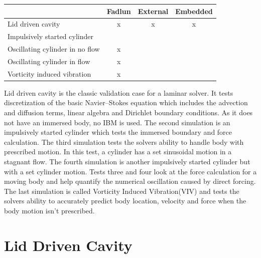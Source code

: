 \begin{center}
\begin{tabular}[htb]{|l|c|c|c|}
	\hline
	& Fadlun & External & Embedded \\ \hline
	Lid driven cavity & x & x & x \\ \hline
	Impulsively started cylinder & \checkmark & \checkmark & \checkmark \\ \hline
	Oscillating cylinder in no flow & x & \checkmark & \checkmark \\ \hline
	Oscillating cylinder in flow & x & \checkmark & \checkmark \\ \hline
	Vorticity induced vibration & x & \checkmark & \checkmark \\
	\hline
\end{tabular}
\end{center}

Lid driven cavity is the classic validation case for a laminar solver. 
It tests discretization of the basic Navier--Stokes equation which includes the advection and diffusion terms, linear algebra and Dirichlet boundary conditions.
As it does not have an immersed body, no IBM is used. 
The second simulation is an impulsively started cylinder which tests the immersed boundary and force calculation. 
The third simulation tests the solvers ability to handle body with prescribed motion. 
In this test, a cylinder has a set sinusoidal motion in a stagnant flow. 
The fourth simulation is another impulsively started cylinder but with a set cylinder motion. 
Tests three and four look at the force calculation for a moving body and help quantify the numerical oscillation caused by direct forcing. 
The last simulation is called Vorticity Induced Vibration(VIV) and tests the solvers ability to accurately predict body location, velocity and force when the body motion isn't prescribed. 

\section{Lid Driven Cavity}

